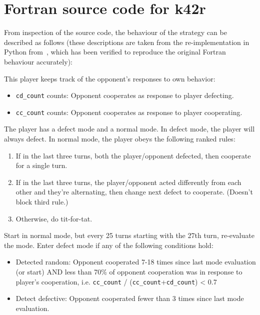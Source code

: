 \documentclass{article}
\begin{document}
\section{Fortran source code for k42r}\label{app:k42r_fortran}

From inspection of the 
source code, the behaviour of the strategy can be described as follows 
(these descriptions are taken from the re-implementation in Python 
from~\cite{AxelrodProject}, which has been verified to reproduce the original 
Fortran behaviour accurately):

This player keeps track of the opponent's responses to own behavior:

    \begin{itemize}
        \item \texttt{cd\_count} counts: Opponent cooperates as response to player defecting.
        \item \texttt{cc\_count} counts: Opponent cooperates as response to player cooperating.
    \end{itemize}

The player has a defect mode and a normal mode.  In defect mode, the
player will always defect.  In normal mode, the player obeys the following
ranked rules:

    \begin{enumerate}
        \item If in the last three turns, both the player/opponent defected, then
            cooperate for a single turn.
        \item If in the last three turns, the player/opponent acted differently from
            each other and they're alternating, then change next defect to
            cooperate.  (Doesn't block third rule.)
        \item Otherwise, do tit-for-tat.
    \end{enumerate}

Start in normal mode, but every 25 turns starting with the 27th turn,
re-evaluate the mode.  Enter defect mode if any of the following
conditions hold:

    \begin{itemize}
        \item Detected random:  Opponent cooperated 7-18 times since last mode
evaluation (or start) AND less than 70\% of opponent cooperation was in
response to player's cooperation, i.e.
    \texttt{cc\_count} / (\texttt{cc\_count}+\texttt{cd\_count}) < 0.7
\item Detect defective:  Opponent cooperated fewer than 3 times since last mode
evaluation.
    \end{itemize}
\end{document}
